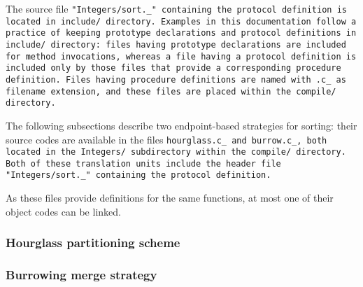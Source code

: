 \def\Subsubsection#1{\subsubsection{#1}
}

The source file \tt{"Integers/sort._"} containing the
protocol definition is located in \tt{include/} directory.
Examples in this documentation follow a practice of keeping prototype
declarations and protocol definitions in \tt{include/} directory:
files having prototype declarations are included for method
invocations, whereas a file having a protocol definition is included
only by those files that provide a corresponding procedure definition.
Files having procedure definitions are named with \tt{.c_} as filename
extension, and these files are placed within the \tt{compile/} directory.

The following subsections describe two endpoint-based strategies for sorting:
their source codes are available in the files \tt{hourglass.c_} and \tt{burrow.c_},
both located in the \tt{Integers/} subdirectory within the \tt{compile/} directory.
Both of these translation units include the header file
\tt{"Integers/sort._"} containing the protocol definition.

\note As these files provide definitions for the same functions,
at most one of their object codes can be linked.

\Subsubsection{Hourglass partitioning scheme}

\Subsubsection{Burrowing merge strategy}
